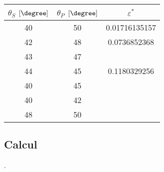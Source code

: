 \begin{tabular}{|c|c|c|}
\hline 
$\theta_{S}$ $[\degree]$ & $\theta_{P}$ $[\degree]$ & $\varepsilon^{*}$ \\ 
\hline 
40 & 50 & 0.01716135157 \\ 
\hline 
42 & 48 & 0.0736852368 \\ 
\hline 
43 & 47 &  \\ 
\hline 
44 & 45 & 0.1180329256 \\
\hline 
40 & 45 & \\
\hline 
40 & 42 &  \\
\hline 
48 & 50 & \\
\hline 
\end{tabular} 







\subsection*{Calcul}
.









